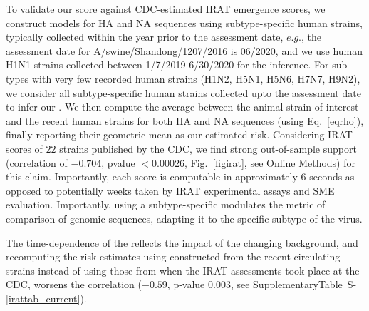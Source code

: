 \documentclass[onecolumn, compsoc,10pt]{IEEEtran}
\def\SUPPLEMENTARY{Supplementary}
\def\METHODS{Online Methods\xspace}
\begin{document}
To validate our score against CDC-estimated IRAT emergence scores, we construct \enet models for HA and NA sequences using subtype-specific human strains, typically collected within the  year prior to the assessment date, $e.g.$,  the  assessment date for A/swine/Shandong/1207/2016 is 06/2020, and  we  use human H1N1 strains collected  between 1/7/2019-6/30/2020 for the \enet inference. For sub-types with very few recorded human strains (H1N2, H5N1, H5N6, H7N7, H9N2), we consider all subtype-specific human strains collected upto the  assessment date  to infer our \enet. We then compute the average \qdist between the animal  strain of interest  and the recent human strains for both HA and NA sequences (using Eq.~\eqref{eqrho}),  finally reporting their geometric mean as our estimated risk. Considering IRAT scores of $22$ strains published by the CDC, we find strong out-of-sample support  (correlation of $-0.704$, pvalue $< 0.00026$, Fig.~\ref{figirat}, see \METHODS) for this claim. Importantly, each \erisk score  is  computable in approximately $6$ seconds as opposed to potentially weeks taken by IRAT experimental assays and SME evaluation. Importantly,  using a  subtype-specific \enet modulates the  metric of comparison of genomic sequences, adapting it to the specific subtype of the virus.


The time-dependence of the \erisk reflects the impact of the changing background, and recomputing the risk estimates using  constructed from the recent circulating strains instead of using those from when the IRAT assessments took place at the  CDC,  worsens the correlation ($-0.59$, p-value $0.003$, see \SUPPLEMENTARY Table~S-\ref{irattab_current}).
\end{document}
